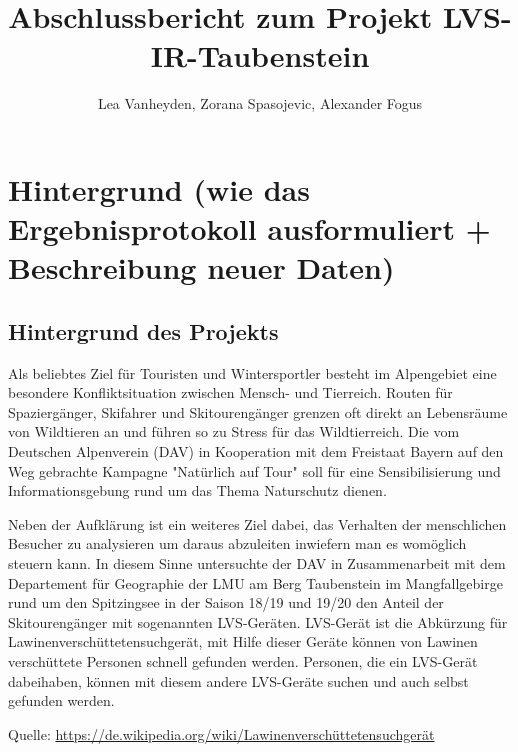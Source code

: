 \documentclass[11pt,a4paper]{report}
\title{Abschlussbericht zum Projekt LVS-IR-Taubenstein}
\author{Lea Vanheyden, Zorana Spasojevic, Alexander Fogus}
\begin{document}
	
\maketitle
	
\tableofcontents

\newpage

\chapter{Hintergrund (wie das Ergebnisprotokoll ausformuliert + Beschreibung neuer Daten)}

\section{Hintergrund des Projekts}
Als beliebtes Ziel für Touristen und Wintersportler besteht im Alpengebiet eine besondere Konfliktsituation zwischen Mensch- und Tierreich. Routen für Spaziergänger, Skifahrer und Skitourengänger grenzen oft direkt an Lebensräume von Wildtieren an und führen so zu Stress für das Wildtierreich. Die vom Deutschen Alpenverein (DAV) in Kooperation mit dem Freistaat Bayern auf den Weg gebrachte Kampagne "Natürlich auf Tour" soll für eine Sensibilisierung und Informationsgebung rund um das Thema Naturschutz dienen.

Neben der Aufklärung ist ein weiteres Ziel dabei, das Verhalten der menschlichen Besucher zu analysieren um daraus abzuleiten inwiefern man es womöglich steuern kann. In diesem Sinne untersuchte der DAV in Zusammenarbeit mit dem Departement für Geographie der LMU am Berg Taubenstein im Mangfallgebirge rund um den Spitzingsee in der Saison 18/19 und 19/20 den Anteil der Skitourengänger mit sogenannten LVS-Geräten. LVS-Gerät ist die Abkürzung für Lawinenverschüttetensuchgerät, mit Hilfe dieser Geräte können von Lawinen verschüttete Personen schnell gefunden werden. Personen, die ein LVS-Gerät dabeihaben, können mit diesem andere LVS-Geräte suchen und auch selbst gefunden werden.

Quelle:
\url{https://de.wikipedia.org/wiki/Lawinenverschüttetensuchgerät}
\end{document}
